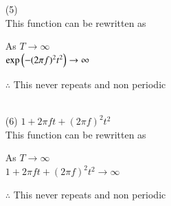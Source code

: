 \documentclass[journal,12pt,twocolumn]{IEEEtran}
\theoremstyle{remark}
\begin{document}
\begin{enumerate}
 \item[(5)]  \\

This function can be rewritten as\\ 
       \begin{center}
     As $T\to\infty$\\
    $\text{exp}\left(-(2\pi f)^2 t^2\right)\to \infty$\\ 
       \end{center}
    $\therefore$  This never repeats and non periodic\\
    \\
    
 \item[(6)] $1+2\pi f t+(2\pi f)^2t^2$\\

This function can be rewritten as\\ 
 \begin{center}
  As $T\to\infty$\\
  $1+2\pi f t+(2\pi f)^2t^2  \to \infty$\\
  \end{center}
  $\therefore$ This never repeats and non periodic\\ 
 
\end{enumerate}
 \renewcommand{\thefigure}{\theenumi}
 \renewcommand{\thetable}{\theenumi}
 
\end{document}
